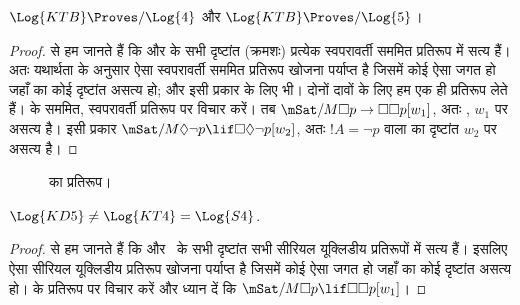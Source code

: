 \documentclass[../../../include/open-logic-section]{subfiles}
\begin{document}
\begin{thm}
  $\Log{KTB} \Proves/ \Log{4}$ और $\Log{KTB} \Proves/ \Log{5}$।
\end{thm}

\begin{proof}
   से हम जानते हैं कि  और
   के सभी दृष्टांत (क्रमशः) प्रत्येक स्वपरावर्ती सममित प्रतिरूप में
  सत्य हैं। अतः यथार्थता के अनुसार ऐसा स्वपरावर्ती सममित प्रतिरूप खोजना
  पर्याप्त है जिसमें कोई ऐसा जगत हो जहाँ  का कोई दृष्टांत असत्य हो;
  और इसी प्रकार  के लिए भी। दोनों दावों के लिए हम एक ही प्रतिरूप
  लेते हैं।  के सममित, स्वपरावर्ती प्रतिरूप पर विचार
  करें। तब $\mSat/{M}{\Box p \to \Box \Box p}[w_1]$, अतः ,
  $w_1$ पर असत्य है। इसी प्रकार $\mSat/{M}{\Diamond
    \lnot p \lif \Box \Diamond \lnot p}[w_2]$, अतः $!A = \lnot p$
  वाला  का दृष्टांत $w_2$ पर असत्य है।
\end{proof}

\begin{figure}[htpb]
  \centering
  \caption{ का प्रतिरूप।}
\end{figure}

\begin{thm}
  $\Log{KD5} \neq \Log{KT4} = \Log{S4}$.
\end{thm}

\begin{proof}
   से हम जानते हैं कि  और~
  के सभी दृष्टांत सभी सीरियल यूक्लिडीय प्रतिरूपों में सत्य हैं। इसलिए ऐसा
  सीरियल यूक्लिडीय प्रतिरूप खोजना पर्याप्त है जिसमें कोई ऐसा जगत हो जहाँ
   का कोई दृष्टांत असत्य हो।  के प्रतिरूप पर
  विचार करें और ध्यान दें कि $\mSat/{M}{\Box p
  \lif \Box\Box p}[w_1]$। 
\end{proof}
\end{document}
